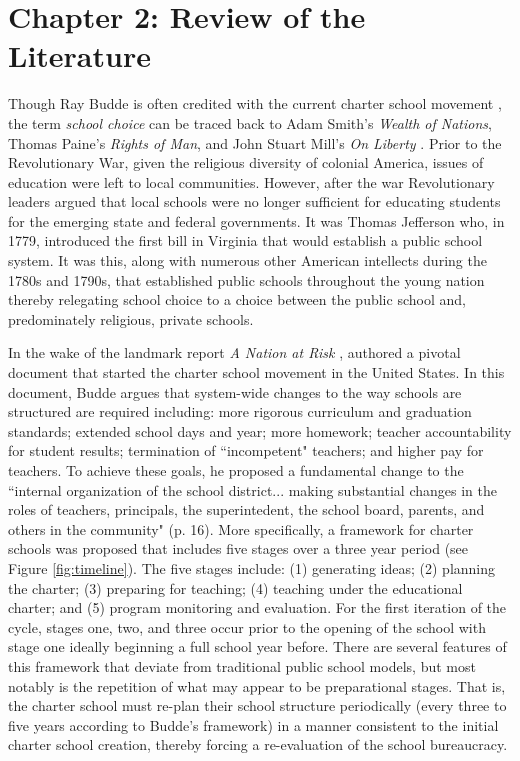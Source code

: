 \documentclass[letterpaper,12p,twoside]{article} %
\begin{document}
\cleardoublepage
\section{Chapter 2: Review of the Literature}

Though Ray Budde is often credited with the current charter school movement \cite{Kolderie2005}, the term \textit{school choice} can be traced back to Adam Smith's \textit{Wealth of Nations}, Thomas Paine's \textit{Rights of Man}, and John Stuart Mill's \textit{On Liberty} \cite{herbst2006}. Prior to the Revolutionary War, given the religious diversity of colonial America, issues of education were left to local communities. However, after the war Revolutionary leaders argued that local schools were no longer sufficient for educating students for the emerging state and federal governments. It was Thomas Jefferson who, in 1779, introduced the first bill in Virginia that would establish a public school system. It was this, along with numerous other American intellects during the 1780s and 1790s, that established public schools throughout the young nation thereby relegating school choice to a choice between the public school and, predominately religious, private schools.

In the wake of the landmark report \textit{A Nation at Risk} \cite{nationatrisk},  authored a pivotal document that started the charter school movement in the United States. In this document, Budde argues that system-wide changes to the way schools are structured are required including: more rigorous curriculum and graduation standards; extended school days and year; more homework; teacher accountability for student results; termination of ``incompetent" teachers; and higher pay for teachers. To achieve these goals, he proposed a fundamental change to the ``internal organization of the school district... making substantial changes in the roles of teachers, principals, the superintedent, the school board, parents, and others in the community" (p. 16). More specifically, a framework for charter schools was proposed that includes five stages over a three year period (see Figure \ref{fig:timeline}). The five stages include: (1) generating ideas; (2) planning the charter; (3) preparing for teaching; (4) teaching under the educational charter; and (5) program monitoring and evaluation. For the first iteration of the cycle, stages one, two, and three occur prior to the opening of the school with stage one ideally beginning a full school year before. There are several features of this framework that deviate from traditional public school models, but most notably is the repetition of what may appear to be preparational stages. That is, the charter school must re-plan their school structure periodically (every three to five years according to Budde's framework) in a manner consistent to the initial charter school creation, thereby forcing a re-evaluation of the school bureaucracy.
\end{document}
